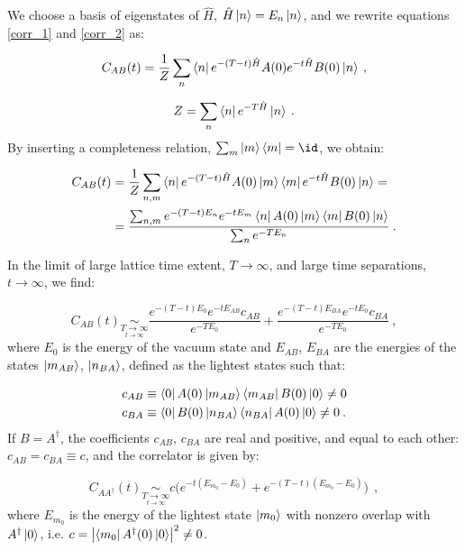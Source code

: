 We choose a basis of eigenstates of $\hat H$, $\hat H \ket{n} = E_n \ket{n}$, and we rewrite equations \ref{corr_1} and \ref{corr_2} as:

\begin{equation}
C_{AB}(t) = \frac{1}{Z} \sum_n \bra{n} e^{-(T-t)\hat H} A(0) e^{-t \hat H} B(0) \ket{n}\: ,
\end{equation}

\begin{equation}
Z = \sum_n \bra{n} e^{-T \hat H} \ket{n} \: .
\end{equation}
%
By inserting a completeness relation, $\sum_m \ket{m} \bra{m} = \id$, we obtain:

\begin{equation}
\begin{split}
C_{AB}(t) & = \frac{1}{Z} \sum_{n,m} \bra{n} e^{-(T-t)\hat H} A(0)\ket{m} \bra{m} e^{-t \hat H} B(0) \ket{n} = \\
& = \frac{\sum _{n,m}e^{-(T-t)E_n} e^{-tE_m}\bra{n} A(0) \ket{m} \bra{m} B(0) \ket{n}}{\sum_n e^{-TE_n}} \: .
\end{split}
\end{equation}


In the limit of large lattice time extent, $T \to \infty$, and large time separations, $t \to \infty$, we find:

\begin{equation}
C_{AB}(t) \underset{\underset{t \to \infty}{T \to \infty}}{\sim}  \frac{e^{-(T-t)E_0} e^{-tE_{AB}}c_{AB}}{e^{-TE_0}} +
\frac{e^{-(T-t)E_{BA}} e^{-tE_0} c_{BA}}{e^{-TE_0}} \: ,
\end{equation}
%
where $E_0$ is the energy of the vacuum state and $E_{AB}$, $E_{BA}$ are the energies of the states $\ket{m_{AB}}$, $\ket{n_{BA}}$, defined as the lightest states such that:

\begin{equation}
\begin{split}
&c_{AB} \equiv \bra{0} A(0) \ket{m_{AB}} \bra{m_{AB}} B(0) \ket{0} \neq 0 \\
&c_{BA} \equiv \bra{0} B(0) \ket{n_{BA}} \bra{n_{BA}} A(0) \ket{0} \neq 0 \: .
\end{split}
\end{equation}
%
If $B=A^{\dagger}$, the coefficients $c_{AB}$, $c_{BA}$ are real and positive, and equal to each other: $c_{AB} = c_{BA} \equiv c$, and the correlator is given by: 

\begin{equation}
C_{AA^{\dagger}}(t) \underset{\underset{t \to \infty}{T \to \infty}}{\sim} c \biggl( e^{-t(E_{m_0} - E_0)} + e^{-(T-t)(E_{m_0}-E_0)} \biggr)\ \: ,
\label{corr_lowest_energy}
\end{equation}
%
where $E_{m_0}$ is the energy of the lightest state $\ket{m_0}$ with nonzero overlap with $A^{\dagger} \ket{0}$, i.e. $c = \abs{\bra{m_0} A^{\dagger}(0) \ket{0}}^2 \neq 0$.

